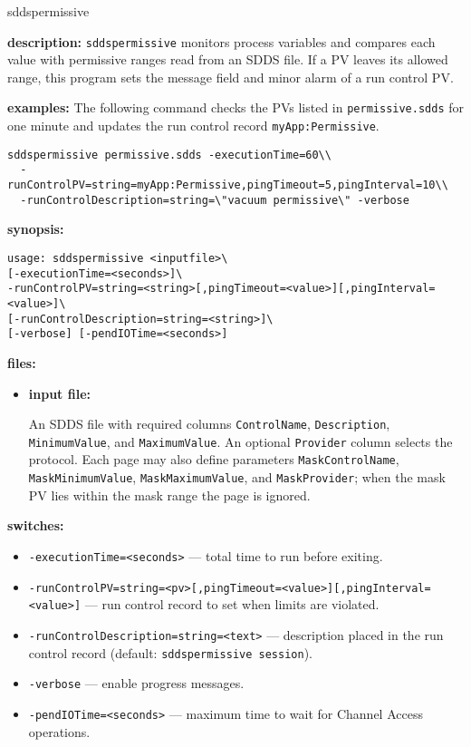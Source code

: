 %
\begin{sddsprog}{sddspermissive}
\item \textbf{description:}
\verb+sddspermissive+ monitors process variables and compares each value with
permissive ranges read from an SDDS file.  If a PV leaves its allowed range,
this program sets the message field and minor alarm of a run control PV.

\item \textbf{examples:}
The following command checks the PVs listed in \verb+permissive.sdds+ for one
minute and updates the run control record \verb+myApp:Permissive+.
\begin{verbatim}
sddspermissive permissive.sdds -executionTime=60\\
  -runControlPV=string=myApp:Permissive,pingTimeout=5,pingInterval=10\\
  -runControlDescription=string=\"vacuum permissive\" -verbose
\end{verbatim}

\item \textbf{synopsis:}
\begin{verbatim}
usage: sddspermissive <inputfile>\
[-executionTime=<seconds>]\
-runControlPV=string=<string>[,pingTimeout=<value>][,pingInterval=<value>]\
[-runControlDescription=string=<string>]\
[-verbose] [-pendIOTime=<seconds>]
\end{verbatim}

\item \textbf{files:}
\begin{itemize}
  \item \textbf{input file:}\par
An SDDS file with required columns \verb+ControlName+, \verb+Description+,
\verb+MinimumValue+, and \verb+MaximumValue+.  An optional \verb+Provider+
column selects the protocol.  Each page may also define parameters
\verb+MaskControlName+, \verb+MaskMinimumValue+, \verb+MaskMaximumValue+,
and \verb+MaskProvider+; when the mask PV lies within the mask range the page
is ignored.
\end{itemize}

\item \textbf{switches:}
\begin{itemize}
  \item {\tt -executionTime=<seconds>} --- total time to run before exiting.
  \item {\tt -runControlPV=string=<pv>[,pingTimeout=<value>][,pingInterval=<value>]} --- run
  control record to set when limits are violated.
  \item {\tt -runControlDescription=string=<text>} --- description placed in the run
  control record (default: \verb+sddspermissive session+).
  \item {\tt -verbose} --- enable progress messages.
  \item {\tt -pendIOTime=<seconds>} --- maximum time to wait for Channel Access operations.
\end{itemize}


\end{sddsprog}
